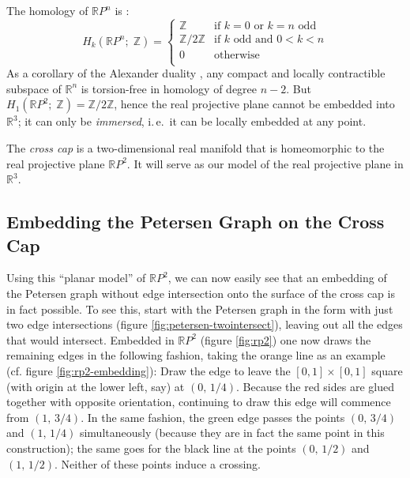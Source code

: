 \documentclass[11pt,            %
               a4paper,         %
               oneside,         %
               DIV12,           %
               fleqn,           %
               halfparskip,     %
               nochapterprefix, %
              ]{scrartcl} %
\theoremstyle{definition}
\begin{document}
The homology of $\mathbb{R}P^n$ is \cite[2.42]{hatcher}:
\[
  H_k(\mathbb{R}P^n;\;\mathbb{Z}) =
                   \begin{cases}
                      \mathbb{Z} & \text{if }k = 0\text{ or }k = n\text{ odd} \\
                      \mathbb{Z}/2\mathbb{Z} & \text{if $k$ odd and } 0 < k < n \\
                      0 & \text{otherwise} \\
                   \end{cases}
\]
As a corollary of the Alexander duality \cite[3.45]{hatcher}, any compact and locally
contractible subspace of $\mathbb{R}^n$ is torsion-free in homology of
degree $n-2$. But $H_1(\mathbb{R}P^2;\;\mathbb{Z}) = \mathbb{Z}/2\mathbb{Z}$, hence
the real projective plane cannot be embedded into $\mathbb{R}^3$; it
can only be \emph{immersed}, i.\,e.~it can be locally embedded at any
point.

The \emph{cross cap} is a two-dimensional real manifold that is
homeomorphic to the real projective plane $\mathbb{R}P^2$. It will
serve as our model of the real projective plane in $\mathbb{R}^3$.

\subsection{Embedding the Petersen Graph on the Cross Cap}

Using this “planar model” of $\mathbb{R}P^2$, we can now easily see
that an embedding of the Petersen graph without edge intersection onto
the surface of the cross cap is in fact possible.
To see this, start with the Petersen graph in the form with just two
edge intersections (figure \ref{fig:petersen-twointersect}), leaving
out all the edges that would intersect.
Embedded in $\mathbb{R}P^2$ (figure \ref{fig:rp2}) one now draws the
remaining edges in the following fashion, taking the orange line as an
example (cf. figure \ref{fig:rp2-embedding}):
Draw the edge to leave the $[0,1]\times[0,1]$ square (with origin at
the lower left, say) at $(0,\,1/4)$.
Because the red sides are glued together with opposite orientation,
continuing to draw this edge will commence from $(1,\,3/4)$.
In the same fashion, the green edge passes the points $(0,\,3/4)$ and
$(1,\,1/4)$ simultaneously (because they are in fact the same point in
this construction); the same goes for the black line at the points
$(0,\,1/2)$ and $(1,\,1/2)$.
Neither of these points induce a crossing.
\end{document}
